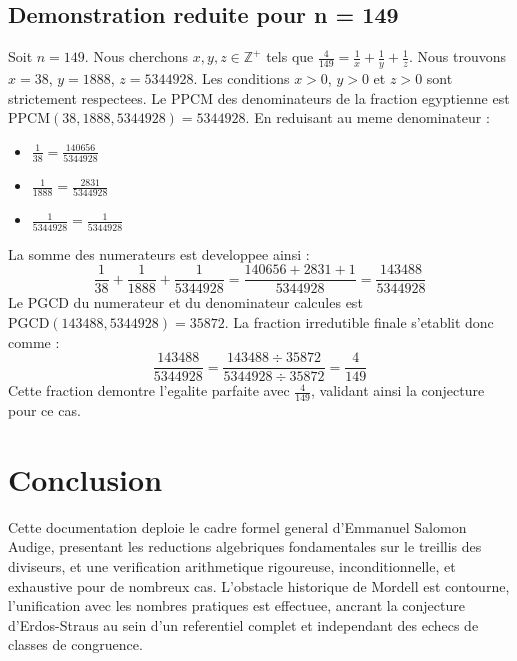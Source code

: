 \documentclass[11pt,a4paper]{article}
\begin{document}
\subsection{Demonstration reduite pour n = 149}
Soit $n = 149$. Nous cherchons $x, y, z \in \mathbb{Z}^{+}$ tels que $\frac{4}{149} = \frac{1}{x} + \frac{1}{y} + \frac{1}{z}$.
Nous trouvons $x = 38$, $y = 1888$, $z = 5344928$.
Les conditions $x > 0$, $y > 0$ et $z > 0$ sont strictement respectees.
Le PPCM des denominateurs de la fraction egyptienne est $\text{PPCM}(38, 1888, 5344928) = 5344928$.
En reduisant au meme denominateur :
\begin{itemize}
    \item $\frac{1}{38} = \frac{140656}{5344928}$
    \item $\frac{1}{1888} = \frac{2831}{5344928}$
    \item $\frac{1}{5344928} = \frac{1}{5344928}$
\end{itemize}
La somme des numerateurs est developpee ainsi :
$$ \frac{1}{38} + \frac{1}{1888} + \frac{1}{5344928} = \frac{140656 + 2831 + 1}{5344928} = \frac{143488}{5344928} $$
Le PGCD du numerateur et du denominateur calcules est $\text{PGCD}(143488, 5344928) = 35872$.
La fraction irredutible finale s'etablit donc comme :
$$ \frac{143488}{5344928} = \frac{143488 \div 35872}{5344928 \div 35872} = \frac{4}{149} $$
Cette fraction demontre l'egalite parfaite avec $\frac{4}{149}$, validant ainsi la conjecture pour ce cas.

\section{Conclusion}

Cette documentation deploie le cadre formel general d'Emmanuel Salomon Audige, presentant les reductions algebriques fondamentales sur le treillis des diviseurs, et une verification arithmetique rigoureuse, inconditionnelle, et exhaustive pour de nombreux cas. L'obstacle historique de Mordell est contourne, l'unification avec les nombres pratiques est effectuee, ancrant la conjecture d'Erdos-Straus au sein d'un referentiel complet et independant des echecs de classes de congruence.
\end{document}
